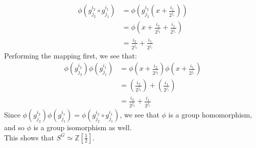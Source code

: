 \documentclass[12pt]{article}%
\newcommand{\Z}{\mathbb{Z}}
\begin{document}
\begin{align*}
\phi\left(g_{j_2}^{i_2} \circ g_{j_1}^{i_1}\right)
&=\phi \left(g_{j_2}^{i_2}\left(x+\frac{i_{1}}{2^{j_1}}\right)\right) \\
&=\phi\left(x+\frac{i_{2}}{2^{j_2}}+\frac{i_{1}}{2^{j_1}}\right) \\
&=\frac{i_{2}}{2^{j_2}}+\frac{i_{1}}{2^{j_1}}
\end{align*}
Performing the mapping first, we see that:
\begin{align*}
\phi\left(g_{j_2}^{i_2}\right)\phi\left(g_{j_1}^{i_1}\right)
&=\phi \left(x+\frac{i_{2}}{2^{j_2}}\right)\phi \left(x+\frac{i_{1}}{2^{j_1}}\right) \\
&=\left(\frac{i_{2}}{2^{j_2}}\right) + \left(\frac{i_{1}}{2^{j_1}}\right) \\
&=\frac{i_{2}}{2^{j_2}}+\frac{i_{1}}{2^{j_1}}
\end{align*}
Since $\phi\left(g_{j_2}^{i_2}\right)\phi\left(g_{j_1}^{i_1}\right)=\phi\left(g_{j_2}^{i_2} \circ g_{j_1}^{i_1}\right)$, we see that $\phi$ is a group homomorphism, and so $\phi$ is a group isomorphism as well. \\

This shows that $S^G\simeq \Z\left[\frac{1}{2}\right]$.
\end{document}
